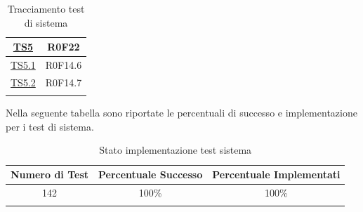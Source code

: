 \documentclass[../PianoDiQualifica.tex]{subfiles}
\begin{document}
\begin{longtable}{|c|c|}
	
		\hyperlink{TS5}{TS5} & R0F22   \\
		\hline
		\hyperlink{TS5.1}{TS5.1} & R0F14.6   \\
		\hline
		\hyperlink{TS5.2}{TS5.2} & R0F14.7   \\
		\hline
		\caption[Tracciamento test di sistema]{Tracciamento test di sistema}
		\label{tabella:TracciamentoTestSistema}
	\end{longtable}
	Nella seguente tabella sono riportate le percentuali di successo e implementazione per i test di sistema.
	\normalsize
	\begin{longtable}{|c|c|c|}
		\hline
		\textbf{Numero di Test} & \textbf{Percentuale Successo} & \textbf{Percentuale Implementati}\\
		\hline
		\endhead
		142 & 
		100\% & 
		100\%\\
		\hline
		\caption[Stato implementazione test sistema]{Stato implementazione test sistema}
		\label{tabella:Stato implementazione test sistema}
	\end{longtable}
	
\newpage
\end{document}
